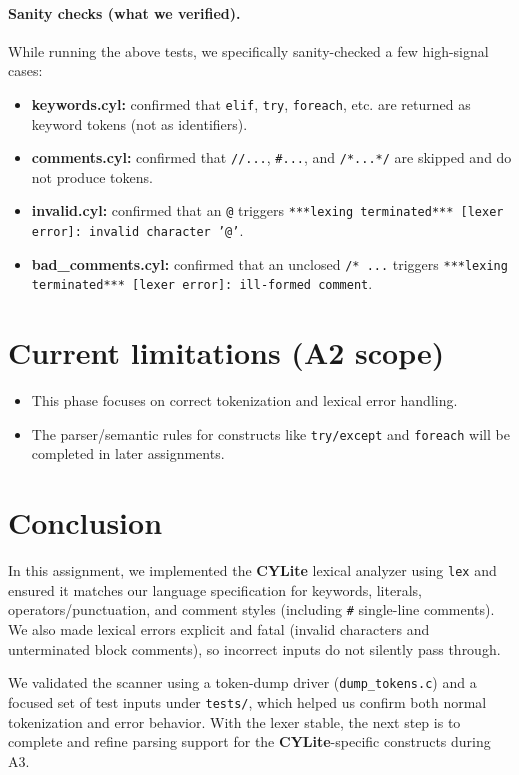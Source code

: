 \documentclass[11pt]{article}
\newcommand{\lang}{\textbf{CYLite}}
\begin{document}
\paragraph{Sanity checks (what we verified).}
While running the above tests, we specifically sanity-checked a few high-signal cases:
\begin{itemize}
	\item \textbf{keywords.cyl:} confirmed that \texttt{elif}, \texttt{try}, \texttt{foreach}, etc. are returned as keyword tokens (not as identifiers).
	\item \textbf{comments.cyl:} confirmed that \texttt{//...}, \texttt{\#...}, and \texttt{/*...*/} are skipped and do not produce tokens.
	\item \textbf{invalid.cyl:} confirmed that an \texttt{@} triggers \texttt{***lexing terminated*** [lexer error]: invalid character '@'}.
	\item \textbf{bad\_comments.cyl:} confirmed that an unclosed \texttt{/* ...} triggers \texttt{***lexing terminated*** [lexer error]: ill-formed comment}.
\end{itemize}

\section{Current limitations (A2 scope)}
\begin{itemize}
	\item This phase focuses on correct tokenization and lexical error handling.
	\item The parser/semantic rules for constructs like \texttt{try/except} and \texttt{foreach} will be completed in later assignments.
\end{itemize}

\section{Conclusion}
In this assignment, we implemented the \lang{} lexical analyzer using \texttt{lex} and ensured it matches our language specification for keywords, literals, operators/punctuation, and comment styles (including \texttt{\#} single-line comments).
We also made lexical errors explicit and fatal (invalid characters and unterminated block comments), so incorrect inputs do not silently pass through.

We validated the scanner using a token-dump driver (\texttt{dump\_tokens.c}) and a focused set of test inputs under \texttt{tests/}, which helped us confirm both normal tokenization and error behavior.
With the lexer stable, the next step is to complete and refine parsing support for the \lang{}-specific constructs during A3.
\end{document}
